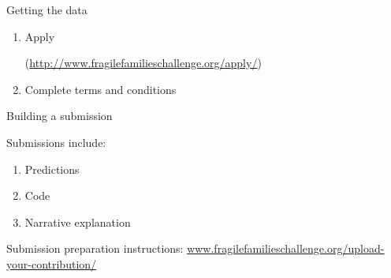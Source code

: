\documentclass{beamer}
\begin{document}
\begin{frame}{Getting the data}

\begin{enumerate}
\item Apply \begin{scriptsize}(\textcolor{blue}{\url{http://www.fragilefamilieschallenge.org/apply/}})\end{scriptsize}
\item Complete terms and conditions
\end{enumerate}

\end{frame}
\begin{frame}{Building a submission}

Submissions include:
\begin{enumerate}
\item Predictions
\item Code
\item Narrative explanation
\end{enumerate}

\vfill
Submission preparation instructions: \textcolor{blue}{\href{http://www.fragilefamilieschallenge.org/upload-your-contribution/}{www.fragilefamilieschallenge.org/upload-your-contribution/}}

\end{frame}
\end{document}
